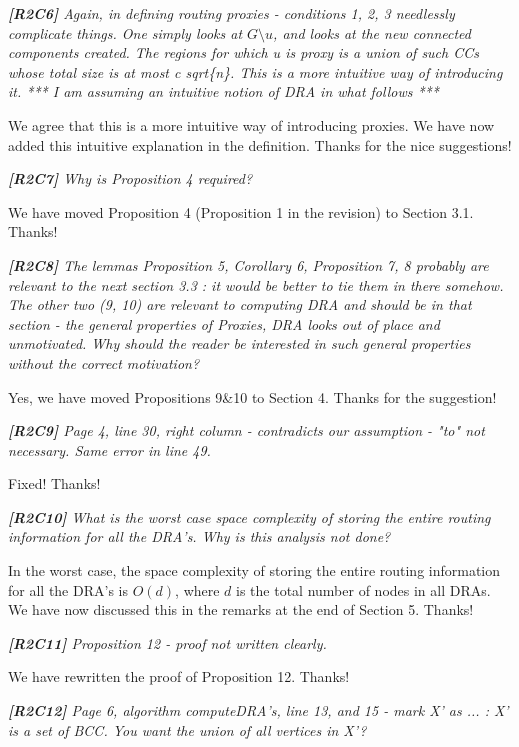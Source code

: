 \documentclass[11pt]{letter}
\newcommand{\vs}{\vspace{1ex}}
\newcommand{\svs}{\vspace{0.36ex}}
\begin{document}
\vs
\noindent
{\em{\bf[R2C6]} Again, in defining routing proxies - conditions 1, 2, 3 needlessly
complicate things. One simply looks at $G \setminus u$, and looks at the
new connected components created. The regions for which u is proxy
is a union of such CCs whose total size is at most c sqrt\{n\}. This
is a more intuitive way of introducing it.
*** I am assuming an intuitive notion of DRA in what follows ***
}
\svs

We agree that this is a more intuitive way of introducing proxies.  We have now added this intuitive explanation in the definition. Thanks for the nice suggestions!



\vs
\noindent
{\em{\bf[R2C7]} Why is Proposition 4 required?}
\svs

We have moved Proposition 4 (Proposition 1 in the revision) to Section 3.1. Thanks!

\vs
\noindent
{\em{\bf[R2C8]} The lemmas Proposition 5, Corollary 6, Proposition 7, 8 probably
are relevant to the next section 3.3 : it would be better to tie them
in there somehow. The other two (9, 10) are relevant to computing DRA
and should be in that section - the general properties of Proxies, DRA
looks out of place and unmotivated. Why should the reader be
interested
in such general properties without the correct motivation?
}

\svs
Yes, we have moved Propositions 9\&10 to Section 4. Thanks for the suggestion!

\vs
\noindent
{\em{\bf[R2C9]} Page 4, line 30, right column - contradicts our assumption - "to" not necessary. Same error in line 49.}
\svs

Fixed! Thanks!

\vs
\noindent
{\em{\bf[R2C10]} What is the worst case space complexity of storing the entire routing information for all the DRA's. Why is this analysis not done?}
\svs

In the worst case, the space complexity of storing the entire routing information for all the DRA's is $O(d)$, where $d$ is the total number of nodes in all DRAs. We have now discussed this in the remarks at the end of Section 5. Thanks!



\vs
\noindent
{\em{\bf[R2C11]} Proposition 12 - proof not written clearly.}

\svs
We have rewritten the proof of Proposition 12. Thanks!

\vs
\noindent
{\em{\bf[R2C12]} Page 6, algorithm computeDRA's, line 13, and 15 - mark X' as ... : X' is a set of BCC. You want the union of all vertices in X'?}
\svs
\end{document}
